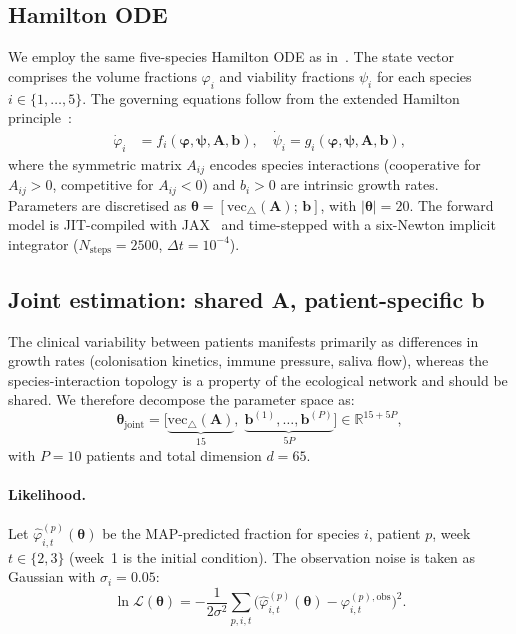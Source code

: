 \documentclass[11pt,a4paper]{article}
\newcommand{\btheta}{\boldsymbol{\theta}}
\newcommand{\bvarphi}{\boldsymbol{\varphi}}
\newcommand{\bpsi}{\boldsymbol{\psi}}
\newcommand{\bA}{\mathbf{A}}
\newcommand{\bb}{\mathbf{b}}
\newcommand{\Real}{\mathbb{R}}
\begin{document}
\subsection{Hamilton ODE}

We employ the same five-species Hamilton ODE as in~\cite{NishiokaTMCMC2025,Klempt2025ContinuumBiofilm}.
The state vector comprises the volume fractions $\varphi_i$ and viability fractions $\psi_i$ for each species $i\in\{1,\ldots,5\}$.
The governing equations follow from the extended Hamilton principle~\cite{JunkerBalzani2021ExtendedHamilton}:
\begin{align}
\dot\varphi_i &= f_i(\bvarphi, \bpsi, \bA, \bb),\quad
\dot\psi_i    = g_i(\bvarphi, \bpsi, \bA, \bb),
\label{eq:ode}
\end{align}
where the symmetric matrix $A_{ij}$ encodes species interactions (cooperative for $A_{ij}>0$, competitive for $A_{ij}<0$) and $b_i>0$ are intrinsic growth rates.
Parameters are discretised as $\btheta = [\mathrm{vec}_{\triangle}(\bA);\, \bb]$, with $|\btheta|=20$.
The forward model is JIT-compiled with JAX~\cite{jax2018github} and time-stepped with a six-Newton implicit integrator ($N_\mathrm{steps}=2500$, $\Delta t=10^{-4}$).

\subsection{Joint estimation: shared A, patient-specific b}

The clinical variability between patients manifests primarily as differences in growth rates (colonisation kinetics, immune pressure, saliva flow), whereas the species-interaction topology is a property of the ecological network and should be shared.
We therefore decompose the parameter space as:
\begin{equation}
\btheta_{\mathrm{joint}} = \bigl[\underbrace{\mathrm{vec}_{\triangle}(\bA)}_{15},\;
\underbrace{\bb^{(1)},\ldots,\bb^{(P)}}_{5P}\bigr]\in\Real^{15+5P},
\label{eq:joint}
\end{equation}
with $P=10$ patients and total dimension $d=65$.

\paragraph{Likelihood.}
Let $\hat\varphi^{(p)}_{i,t}(\btheta)$ be the MAP-predicted fraction for species $i$, patient $p$, week $t\in\{2,3\}$ (week~1 is the initial condition).
The observation noise is taken as Gaussian with $\sigma_i = 0.05$:
\begin{equation}
\ln\mathcal{L}(\btheta) = -\frac{1}{2\sigma^2}
\sum_{p,i,t}\bigl(\hat\varphi^{(p)}_{i,t}(\btheta) - \varphi^{(p),\mathrm{obs}}_{i,t}\bigr)^2.
\label{eq:llh}
\end{equation}
\end{document}
